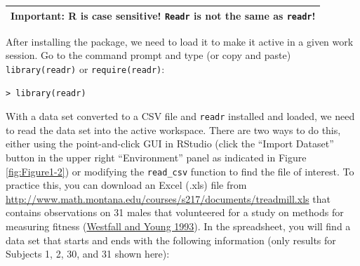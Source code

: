 \documentclass[
]{book}
\begin{document}
\begin{longtable}[]{@{}l@{}}
\toprule()
\endhead
\textbf{Important}: R is case sensitive! \texttt{Readr} is not the same as \texttt{readr}! \\
\bottomrule()
\end{longtable}

\newpage

\indent After installing the package, we need to load it to make it active in a given work
session. Go to the command prompt and type (or copy and paste) \texttt{library(readr)} or \texttt{require(readr)}:

\begin{verbatim}
> library(readr)
\end{verbatim}

With a data set converted to a CSV file and \texttt{readr} installed and loaded, we need to read the data set into the active workspace.
There are two ways to do this, either using the point-and-click GUI in RStudio (click
the ``Import Dataset'' button in the upper right ``Environment'' panel as
indicated in Figure \ref{fig:Figure1-2}) or modifying the \texttt{read\_csv}
function to find the file of interest. To practice this, you can
download an Excel (.xls) file from
\url{http://www.math.montana.edu/courses/s217/documents/treadmill.xls}
that contains observations on 31 males that volunteered for a study on methods
for measuring fitness (\protect\hyperlink{ref-Westfall1993}{Westfall and Young 1993}).
In the spreadsheet, you will find a data set that
starts and ends with the following information (only results for Subjects 1, 2,
30, and 31 shown here):
\end{document}
